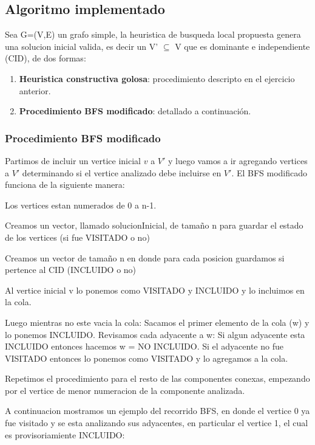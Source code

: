 \subsection{Algoritmo implementado}

Sea G=(V,E) un grafo simple, la heuristica de busqueda local propuesta genera una solucion inicial valida, es decir un V' $\subseteq$ V que es dominante e independiente (CID), de dos formas:
\begin{enumerate}
	\item \textbf{Heuristica constructiva golosa}: procedimiento descripto en el ejercicio anterior.
    \item \textbf{Procedimiento BFS modificado}: detallado a continuación.

\end{enumerate}

\subsubsection{Procedimiento BFS modificado}
Partimos de incluir un vertice inicial $v$ a $V'$ y luego vamos a ir agregando vertices a $V'$ determinando si el vertice analizado debe incluirse en $V'$.
El BFS modificado funciona de la siguiente manera:

\begin{codesnippet}
Los vertices estan numerados de 0 a n-1.

Creamos un vector, llamado solucionInicial, de tamaño n para guardar el estado de los
vertices (si fue VISITADO o no)

Creamos un vector de tamaño n en donde para cada posicion guardamos si
pertence al CID (INCLUIDO o no)

Al vertice inicial v lo ponemos como VISITADO y INCLUIDO y lo incluimos en la cola.

Luego mientras no este vacia la cola:
    Sacamos el primer elemento de la cola (w) y lo ponemos INCLUIDO.
    Revisamos cada adyacente a w:
        Si algun adyacente esta INCLUIDO entonces hacemos w = NO INCLUIDO.
        Si el adyacente no fue VISITADO entonces lo ponemos como VISITADO y
        lo agregamos a la cola.

Repetimos el procedimiento para el resto de las componentes conexas, empezando por
el vertice de menor numeracion de la componente analizada.


\end{codesnippet}

A continuacion mostramos un ejemplo del recorrido BFS, en donde el vertice 0 ya fue visitado y se esta analizando sus adyacentes, en particular el vertice 1, el cual es provisoriamiente INCLUIDO:


